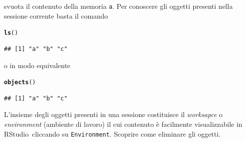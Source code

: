 \documentclass[onecolumn,11pt]{book}\usepackage[]{graphicx}\usepackage[]{color}
\makeatletter
\newcommand{\hlstd}[1]{\textcolor[rgb]{0.345,0.345,0.345}{#1}}%
\newcommand{\hlkwd}[1]{\textcolor[rgb]{0.737,0.353,0.396}{\textbf{#1}}}%
\newenvironment{kframe}{%
 \def\at@end@of@kframe{}%
 \ifinner\ifhmode%
  \def\at@end@of@kframe{\end{minipage}}%
  \begin{minipage}{\columnwidth}%
 \fi\fi%
 \def\FrameCommand##1{\hskip\@totalleftmargin \hskip-\fboxsep
 \colorbox{shadecolor}{##1}\hskip-\fboxsep
     \hskip-\linewidth \hskip-\@totalleftmargin \hskip\columnwidth}%
 \MakeFramed {\advance\hsize-\width
   \@totalleftmargin\z@ \linewidth\hsize
   \@setminipage}}%
 {\par\unskip\endMakeFramed%
 \at@end@of@kframe}
\newenvironment{knitrout}{}{} %
\newcommand{\rst}{\textsf{RStudio}~}
\makeatother
\begin{document}
svuota il contenuto della memoria \texttt{a}. Per conoscere gli oggetti presenti nella sessione corrente basta il comando
\begin{knitrout}
\color{fgcolor}\begin{kframe}
\begin{alltt}
\hlkwd{ls}\hlstd{()}
\end{alltt}
\begin{verbatim}
## [1] "a" "b" "c"
\end{verbatim}
\end{kframe}
\end{knitrout}
o in modo equivalente
\begin{knitrout}
\color{fgcolor}\begin{kframe}
\begin{alltt}
\hlkwd{objects}\hlstd{()}
\end{alltt}
\begin{verbatim}
## [1] "a" "b" "c"
\end{verbatim}
\end{kframe}
\end{knitrout}
L'insieme degli oggetti presenti in una sessione costituisce il \textsl{worksapce} o \textsl{environment} (ambiente di lavoro) il cui contenuto \`e facilmente visualizzabile in \rst   cliccando su \texttt{Environment}.
Scoprire come eliminare gli oggetti.
\end{document}
